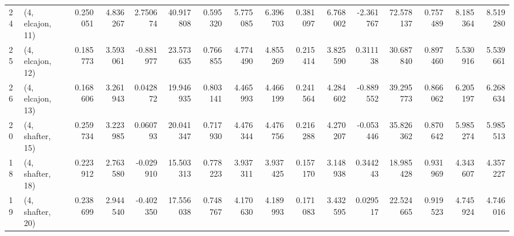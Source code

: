 \begin{tabular}{llrrrrrrrrrrrrrr}
24 &  (4, elcajon, 11) &   0.250051 &  4.836267 &  2.750674 &  40.917808 &  0.595320 &   5.775085 &  6.396703 &  0.381097 &  6.768002 & -2.361767 &   72.578137 &  0.757489 &   8.185364 &   8.519280 \\
25 &  (4, elcajon, 12) &   0.185773 &  3.593061 & -0.881977 &  23.573635 &  0.766855 &   4.774490 &  4.855269 &  0.215414 &  3.825590 &  0.311138 &   30.687840 &  0.897460 &   5.530916 &   5.539661 \\
26 &  (4, elcajon, 13) &   0.168606 &  3.261943 &  0.042872 &  19.946935 &  0.803141 &   4.465993 &  4.466199 &  0.241564 &  4.284602 & -0.889552 &   39.295773 &  0.866062 &   6.205197 &   6.268634 \\
20 &  (4, shafter, 15) &   0.259734 &  3.223985 &  0.060793 &  20.041347 &  0.717930 &   4.476344 &  4.476756 &  0.216288 &  4.270207 & -0.053446 &   35.826362 &  0.870642 &   5.985274 &   5.985513 \\
18 &  (4, shafter, 18) &   0.223912 &  2.763580 & -0.029910 &  15.503313 &  0.778223 &   3.937311 &  3.937425 &  0.157170 &  3.148938 &  0.344243 &   18.985428 &  0.931969 &   4.343607 &   4.357227 \\
19 &  (4, shafter, 20) &   0.238699 &  2.944540 & -0.402350 &  17.556038 &  0.748767 &   4.170630 &  4.189993 &  0.171083 &  3.432595 &  0.029517 &   22.524665 &  0.919523 &   4.745924 &   4.746016 \\
\bottomrule
\end{tabular}
